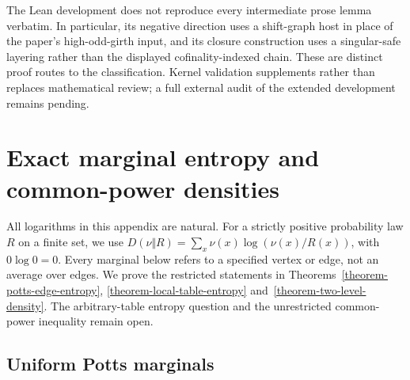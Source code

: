 \documentclass[a4paper,11pt,reqno]{amsart}
\theoremstyle{plain}
\theoremstyle{definition}
\theoremstyle{remark}
\begin{document}
The Lean development does not reproduce every intermediate prose lemma
verbatim.  In particular, its negative direction uses a shift-graph host in
place of the paper's high-odd-girth input, and its closure construction uses
a singular-safe layering rather than the displayed cofinality-indexed chain.
These are distinct proof routes to the classification.  Kernel validation
supplements rather than replaces mathematical review; a full external audit
of the extended development remains pending.

\section{Exact marginal entropy and common-power densities}
\label{appendix-entropy-density}

All logarithms in this appendix are natural.  For a strictly positive
probability law $R$ on a finite set, we use
$D(\nu\Vert R)=\sum_x\nu(x)\log(\nu(x)/R(x))$, with $0\log0=0$.
Every marginal below refers to a specified vertex or edge, not an average
over edges.  We prove the restricted statements in
Theorems~\ref{theorem-potts-edge-entropy}, \ref{theorem-local-table-entropy}
and~\ref{theorem-two-level-density}.  The arbitrary-table entropy question
and the unrestricted common-power inequality remain open.

\subsection{Uniform Potts marginals}
\end{document}
